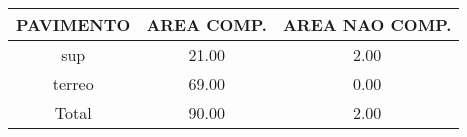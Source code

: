 \documentclass[11pt]{article}
\begin{document}
\begin{tabular}{ccc}
\hline
PAVIMENTO & AREA COMP. & AREA NAO COMP.\\
\hline
sup & 21.00 & 2.00 \\
terreo & 69.00 & 0.00 \\
Total & 90.00 & 2.00 \\
\hline
\end{tabular}
\end{document}

